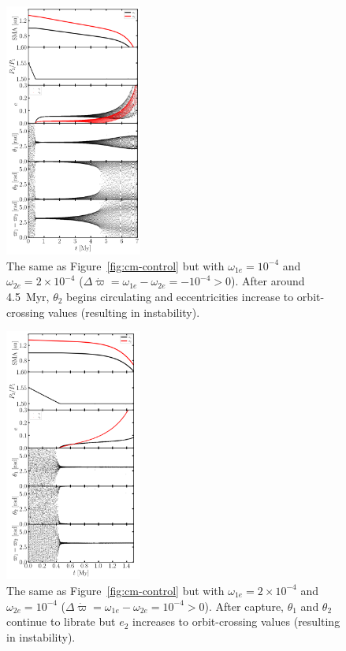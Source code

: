 \documentclass[usenatbib,twocolumn]{mnras}
\begin{document}
\begin{figure}
    \includegraphics[width=0.4\textwidth]{cm_1e-4_2e-4.png}
    \caption{The same as Figure~\ref{fig:cm-control} but with $\omega_{1e}=10^{-4}$ and $\omega_{2e}=2\times10^{-4}$ ($\Delta\dot\varpi=\omega_{1e}-\omega_{2e}=-10^{-4}>0$). After around 4.5~Myr, $\theta_2$ begins circulating and eccentricities increase to orbit-crossing values (resulting in instability).}
    \label{fig:cm-neg-dDpom}
\end{figure}

\begin{figure}
    \includegraphics[width=0.4\textwidth]{cm_2e-4_1e-4.png}
    \caption{The same as Figure~\ref{fig:cm-control} but with $\omega_{1e}=2\times10^{-4}$ and $\omega_{2e}=10^{-4}$ ($\Delta\dot\varpi=\omega_{1e}-\omega_{2e}=10^{-4}>0$). After capture, $\theta_1$ and $\theta_2$ continue to librate but $e_2$ increases to orbit-crossing values (resulting in instability).
    }
    \label{fig:cm-pos-dDpom}
\end{figure}
\end{document}
